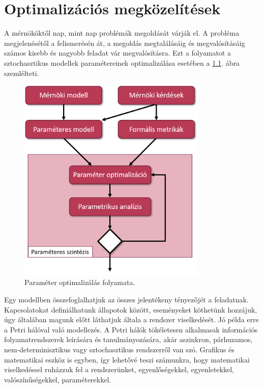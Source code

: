 \chapter{Optimalizációs megközelítések}
\label{sec:optimalizacios-megkozelitesek}

A mérnököktől nap, mint nap problémák megoldását várják el. A probléma megjelenésétől a felismerésén át, a megoldás megtalálásáig és megvalósításáig számos kisebb és nagyobb feladat vár megvalósításra. Ezt a folyamatot a sztochasztikus modellek paramétereinek optimalizálása esetében a \ref{fig:folyamat}. ábra szemlélteti.

\begin{figure}[!ht]
	\centering
	\includegraphics[width=90mm, keepaspectratio]{figures/abra.png}
	\caption{Paraméter optimalizálás folyamata.}
	\label{fig:folyamat}
\end{figure}

Egy modellben összefoglalhatjuk az összes jelentékeny tényezőjét a feladatnak. Kapcsolatokat definiálhatunk állapotok között, eseményeket köthetünk hozzájuk, úgy általában magunk előtt láthatjuk általa a rendszer viselkedését. Jó példa erre a Petri hálóval való modellezés. A Petri hálók tökéletesen alkalmasak információs folyamatrendszerek leírására és tanulmányozására, akár aszinkron, párhuzamos, nem-determinisztikus vagy sztochasztikus rendszerről van szó. Grafikus és matematikai eszköz is egyben, így lehetővé teszi számunkra, hogy matematikai viselkedéssel ruházzuk fel a rendszerünket, egyenlőségekkel, egyenletekkel, valószínűségekkel, paraméterekkel.\cite{PetriCikk}

